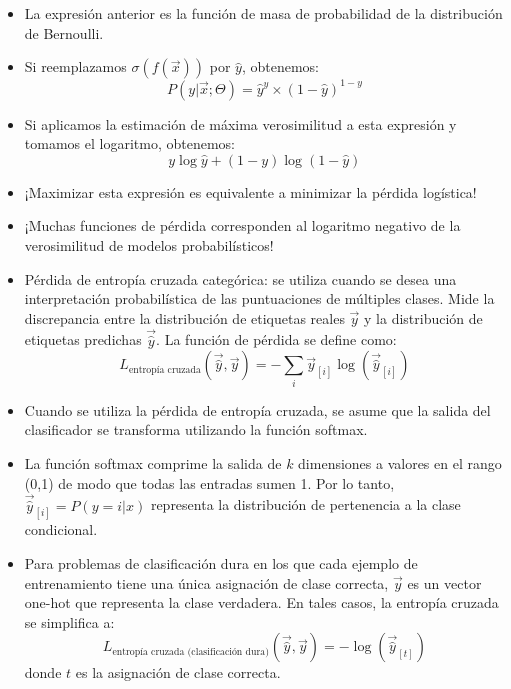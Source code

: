 \begin{itemize}
 \item La expresión anterior es la función de masa de probabilidad de la distribución de Bernoulli.

 \item Si reemplazamos $\sigma(f(\vec{x}))$ por $\hat{y}$, obtenemos:
 \begin{displaymath}
  P(y | \vec{x} ; \Theta) = \hat{y}^y\times(1-\hat{y})^{1-y}
 \end{displaymath}
 \item Si aplicamos la estimación de máxima verosimilitud a esta expresión y tomamos el logaritmo, obtenemos:
 \begin{displaymath}
  y \log \hat{y} + (1-y) \log(1-\hat{y})
 \end{displaymath}

 \item ¡Maximizar esta expresión es equivalente a minimizar la pérdida logística!

 \item ¡Muchas funciones de pérdida corresponden al logaritmo negativo de la verosimilitud de modelos probabilísticos!



\item Pérdida de entropía cruzada categórica: se utiliza cuando se desea una interpretación probabilística de las puntuaciones de múltiples clases. Mide la discrepancia entre la distribución de etiquetas reales $\vec{y}$ y la distribución de etiquetas predichas $\vec{\hat{y}}$. La función de pérdida se define como:
\begin{displaymath}
L_{\text{entropía cruzada}}(\vec{\hat{y}},\vec{y}) = - \sum_{i} \vec{y}_{[i]} \log(\vec{\hat{y}}_{[i]})
\end{displaymath}

\item Cuando se utiliza la pérdida de entropía cruzada, se asume que la salida del clasificador se transforma utilizando la función softmax.

\item La función softmax comprime la salida de $k$ dimensiones a valores en el rango (0,1) de modo que todas las entradas sumen 1. Por lo tanto, $\vec{\hat{y}}_{[i]} = P(y = i |x)$ representa la distribución de pertenencia a la clase condicional.

\item Para problemas de clasificación dura en los que cada ejemplo de entrenamiento tiene una única asignación de clase correcta, $\vec{y}$ es un vector one-hot que representa la clase verdadera. En tales casos, la entropía cruzada se simplifica a:
\begin{displaymath}
L_{\text{entropía cruzada (clasificación dura)}}(\vec{\hat{y}},\vec{y}) = -\log(\vec{\hat{y}}_{[t]})
\end{displaymath}
donde $t$ es la asignación de clase correcta.

\end{itemize}

